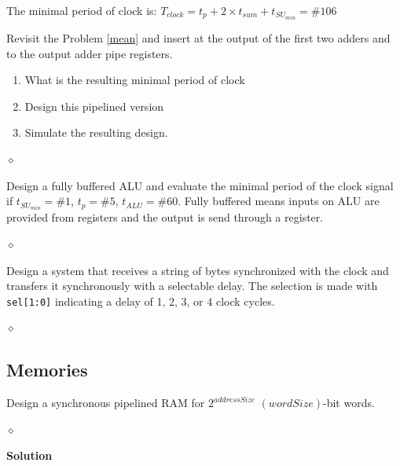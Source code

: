 The minimal period of clock is: $T_{clock} = t_p + 2 \times t_{sum} + t_{SU_{min}} = \#106$

\begin{problem}
Revisit the Problem \ref{mean} and insert at the output of the first two adders and to the output adder pipe registers.
\begin{enumerate}
    \item What is the resulting minimal period of clock
    \item Design this pipelined version
    \item Simulate the resulting design.
\end{enumerate}

$\diamond$
\end{problem}

\begin{problem}
Design a fully buffered ALU and evaluate the minimal period of the clock signal if $t_{SU_{min}} = \#1$, $t_p = \#5$, $t_{ALU} = \#60$. Fully buffered means inputs on ALU are provided from registers and the output is send through a register.

$\diamond$
\end{problem}

\begin{problem}
Design a system that receives a string of bytes synchronized with the clock and transfers it synchronously with a selectable delay. The selection is made with {\tt sel[1:0]} indicating a delay of 1, 2, 3, or 4 clock cycles.

$\diamond$
\end{problem}

\subsection{Memories}

\begin{problem}
Design a synchronous pipelined RAM for $2^{addressSize}$ $(wordSize)$-bit words.

$\diamond$
\end{problem}

{\bf Solution}


